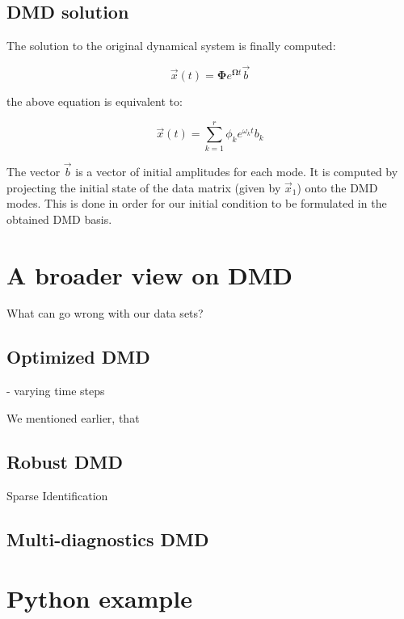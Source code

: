 \documentclass[10pt,twocolumn]{article}
\begin{document}
\subsection{DMD solution}

The solution to the original dynamical system is finally computed:

\begin{equation} \label{eq:x-solution-matrix}
\vec{x}(t) = \bm{\Phi} e^{\bm{\Omega} t} \vec{b}
\end{equation}

the above equation is equivalent to:

\begin{equation} \label{eq:x-solution-summation}
\vec{x}(t)  = \sum_{k=1}^{r} \phi_k e^{\omega_k t} b_k
\end{equation}

The vector $\vec{b}$ is a vector of initial amplitudes for each mode. It is computed by projecting the initial state of the data matrix (given by $\vec{x}_1$) onto the DMD modes. This is done in order for our initial condition to be formulated in the obtained DMD basis.



\section{A broader view on DMD} \label{sec:view}

What can go wrong with our data sets?

\subsection{Optimized DMD}

- varying time steps

We mentioned earlier, that 

\subsection{Robust DMD}



Sparse Identification




\subsection{Multi-diagnostics DMD}

\section{Python example}
\end{document}
